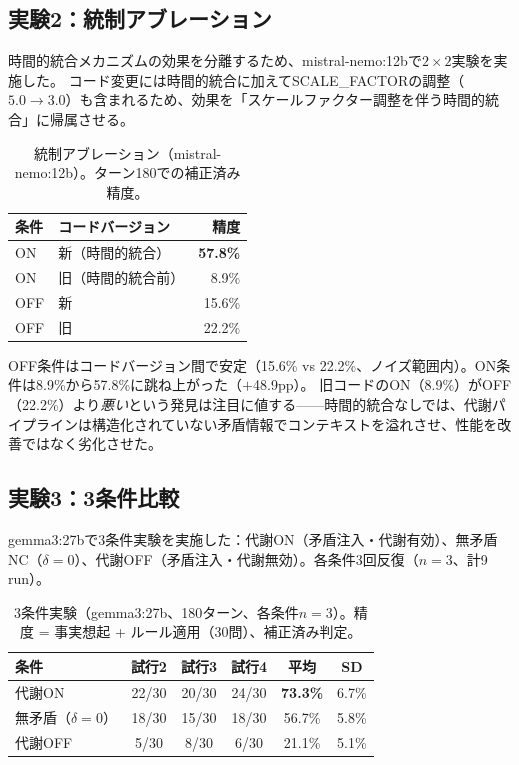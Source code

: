 \documentclass[11pt,a4paper]{article}
\begin{document}
\subsection{実験2：統制アブレーション}
\label{sec:exp-ablation}

時間的統合メカニズムの効果を分離するため、mistral-nemo:12bで$2 \times 2$実験を実施した。
コード変更には時間的統合に加えてSCALE\_FACTORの調整（$5.0 \to 3.0$）も含まれるため、効果を「スケールファクター調整を伴う時間的統合」に帰属させる。

\begin{table}[htbp]
\centering
\caption{統制アブレーション（mistral-nemo:12b）。ターン180での補正済み精度。}
\label{tab:ablation}
\begin{tabular}{llr}
\toprule
条件 & コードバージョン & 精度 \\
\midrule
ON & 新（時間的統合） & \textbf{57.8\%} \\
ON & 旧（時間的統合前） & 8.9\% \\
OFF & 新 & 15.6\% \\
OFF & 旧 & 22.2\% \\
\bottomrule
\end{tabular}
\end{table}

OFF条件はコードバージョン間で安定（15.6\% vs 22.2\%、ノイズ範囲内）。ON条件は8.9\%から57.8\%に跳ね上がった（$+$48.9pp）。
旧コードのON（8.9\%）がOFF（22.2\%）より\emph{悪い}という発見は注目に値する——時間的統合なしでは、代謝パイプラインは構造化されていない矛盾情報でコンテキストを溢れさせ、性能を改善ではなく劣化させた。

\subsection{実験3：3条件比較}
\label{sec:exp-threecond}

gemma3:27bで3条件実験を実施した：代謝ON（矛盾注入・代謝有効）、無矛盾NC（$\delta = 0$）、代謝OFF（矛盾注入・代謝無効）。各条件3回反復（$n = 3$、計9 run）。

\begin{table}[htbp]
\centering
\caption{3条件実験（gemma3:27b、180ターン、各条件$n = 3$）。精度 = 事実想起 + ルール適用（30問）、補正済み判定。}
\label{tab:threecond}
\begin{tabular}{lccccc}
\toprule
条件 & 試行2 & 試行3 & 試行4 & 平均 & SD \\
\midrule
代謝ON & 22/30 & 20/30 & 24/30 & \textbf{73.3\%} & 6.7\% \\
無矛盾（$\delta = 0$） & 18/30 & 15/30 & 18/30 & 56.7\% & 5.8\% \\
代謝OFF & 5/30 & 8/30 & 6/30 & 21.1\% & 5.1\% \\
\bottomrule
\end{tabular}
\end{table}
\end{document}
